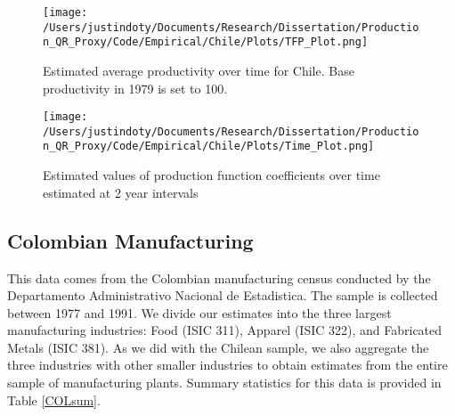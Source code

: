 \documentclass[11pt]{article}
\begin{document}
\begin{figure}[H]
\centering
\texttt{[image: /Users/justindoty/Documents/Research/Dissertation/Production\_QR\_Proxy/Code/Empirical/Chile/Plots/TFP\_Plot.png]}
\caption{Estimated average productivity over time for Chile. Base productivity in 1979 is set to 100.}
\label{fig:CHLpgrowth}
\end{figure}

\begin{figure}[H]
\centering
\texttt{[image: /Users/justindoty/Documents/Research/Dissertation/Production\_QR\_Proxy/Code/Empirical/Chile/Plots/Time\_Plot.png]}
\caption{Estimated values of production function coefficients over time estimated at 2 year intervals}
\label{fig:CHLtimecoef}
\end{figure}



\subsection{Colombian Manufacturing}
This data comes from the Colombian manufacturing census conducted by the Departamento Administrativo Nacional de Estadistica. The sample is collected between 1977 and 1991. We divide our estimates into the three largest manufacturing industries: Food (ISIC 311), Apparel (ISIC 322), and Fabricated Metals (ISIC 381). As we did with the Chilean sample, we also aggregate the three industries with other smaller industries to obtain estimates from the entire sample of manufacturing plants. Summary statistics for this data is provided in Table \ref{COLsum}.
\end{document}
